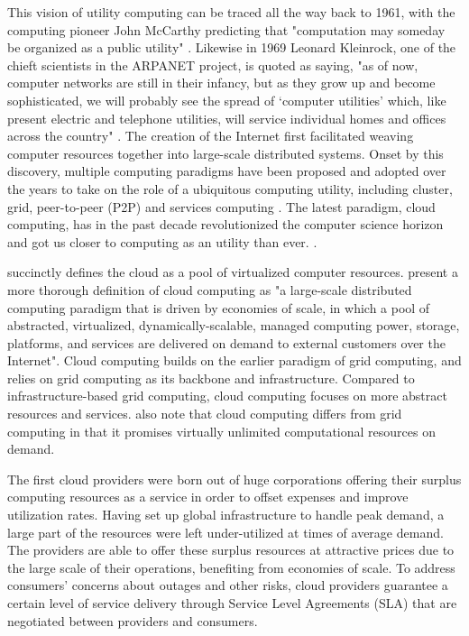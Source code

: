 \documentclass[utf8,english]{gradu3}
\begin{document}
This vision of utility computing can be traced all the way back to 1961, with the computing pioneer John McCarthy predicting that "computation may someday be organized as a public utility" \parencite{foster08cloudGrid}. Likewise in 1969 Leonard Kleinrock, one of the chieft scientists in the ARPANET project, is quoted as saying, "as of now, computer networks are still in their infancy, but as they grow up and become sophisticated, we will probably see the spread of ‘computer utilities’ which, like present electric and telephone utilities, will service individual homes and offices across the country" \parencite{kleinrock03internet}. The creation of the Internet first facilitated weaving computer resources together into large-scale distributed systems. Onset by this discovery, multiple computing paradigms have been proposed and adopted over the years to take on the role of a ubiquitous computing utility, including cluster, grid, peer-to-peer (P2P) and services computing \parencite{buyya09cloud}. The latest paradigm, cloud computing, has in the past decade revolutionized the computer science horizon and got us closer to computing as an utility than ever. \parencite{buyya2017manifesto}.

\textcite{sareen13cloudTypes} succinctly defines the cloud as a pool of virtualized computer resources. \textcite{foster08cloudGrid} present a more thorough definition of cloud computing as "a large-scale distributed computing paradigm that is driven by economies of scale, in which a pool of abstracted, virtualized, dynamically-scalable, managed computing power, storage, platforms, and services are delivered on demand to external customers over the Internet". Cloud computing builds on the earlier paradigm of grid computing, and relies on grid computing as its backbone and infrastructure. Compared to infrastructure-based grid computing, cloud computing focuses on more abstract resources and services. \textcite{buyya2017manifesto} also note that cloud computing differs from grid computing in that it
promises virtually unlimited computational resources on demand.


The first cloud providers were born out of huge corporations offering their surplus computing resources as a service in order to offset expenses and improve utilization rates. Having set up global infrastructure to handle peak demand, a large part of the resources were left under-utilized at times of average demand. The providers are able to offer these surplus resources at attractive prices due to the large scale of their operations, benefiting from economies of scale. To address consumers' concerns about outages and other risks, cloud providers guarantee a certain level of service delivery through Service Level Agreements (SLA) that are negotiated between providers and consumers. \parencite{youseff08cloudOntology}
\end{document}
